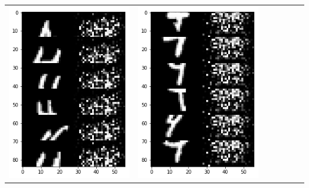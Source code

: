 \documentclass[12pt]{report} %
\begin{document}
\begin{tabular}{m{0.7cm}m{2.4cm}m{2.4cm}m{2.4cm}m{2.4cm}m{2.4cm}m{2.4cm}}
	\includegraphics[scale=0.3]{pictures/M2_4_up.png} & \includegraphics[scale=0.3]{pictures/M2_4_down.png}\\
\end{tabular}
\end{document}
